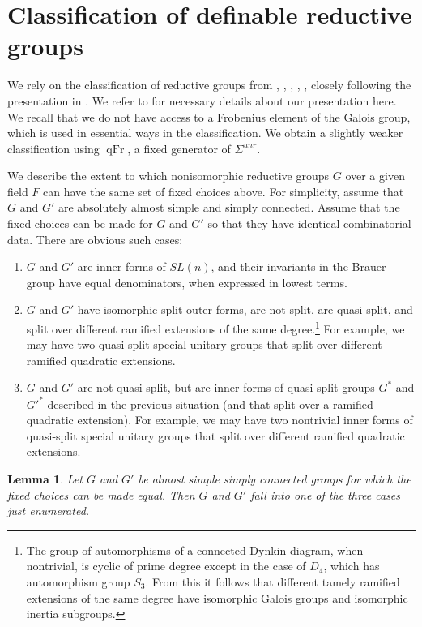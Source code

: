 \documentclass[12pt]{amsart}
\newcommand{\op}[1]{\operatorname{#1}}
\theoremstyle{plain}
\newtheorem{lem}[thm]{Lemma}
\theoremstyle{definition}
\begin{document}
\section{Classification of definable reductive groups}\label{sec:classification}

We rely on the classification of reductive groups from \cite{Gille},
\cite{Tits}, \cite{Sel}, \cite{Petrov}, \cite{reeder2010torsion},
closely following the presentation in \cite{Gross}.  We refer to
\cite{Gross} for necessary details about our presentation here.  We
recall that we do not have access to a Frobenius element of the Galois
group, which is used in essential ways in the classification.  We
obtain a slightly weaker classification using $\op{qFr}$, a fixed
generator of $\Sigma^{unr}$.

We describe the extent to which nonisomorphic reductive groups $G$
over a given field $F$ can have the same set of fixed choices above.
For simplicity, assume that $G$ and $G'$ are absolutely almost simple
and simply connected.  Assume that the fixed choices can be made for
$G$ and $G'$ so that they have identical combinatorial data.  There
are obvious such cases:
\begin{enumerate}
\item $G$ and $G'$ are inner forms of $SL(n)$, and their invariants in
  the Brauer group have equal denominators, when expressed in lowest terms.
\item $G$ and $G'$ have isomorphic split outer forms, are not split,
  are quasi-split, and split over different ramified extensions of the
  same degree.\footnote{The group of automorphisms of a connected
    Dynkin diagram, when nontrivial, is cyclic of prime degree except
    in the case of $D_4$, which has automorphism group $S_3$.  From
    this it follows that different tamely ramified extensions of the
    same degree have isomorphic Galois groups and isomorphic inertia
    subgroups.}  For example, we may have two quasi-split special
  unitary groups that split over different ramified quadratic
  extensions.
\item $G$ and $G'$ are not quasi-split, but are inner forms of
  quasi-split groups $G^*$ and $G'^{*}$ described in the previous
  situation (and that split over a ramified quadratic extension).  
  For example, we may have two nontrivial inner forms of
  quasi-split special unitary groups that split over different
  ramified quadratic extensions.
\end{enumerate}

\begin{lem} Let $G$ and $G'$ be almost simple simply connected groups
  for which the fixed choices can be made equal.  Then $G$ and $G'$
  fall into one of the three cases just enumerated.
\end{lem}
\end{document}
